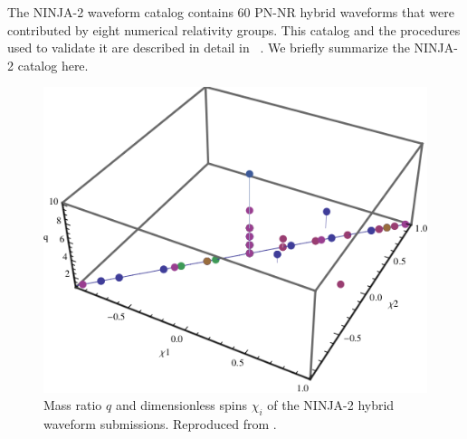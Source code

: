 The NINJA-2 waveform catalog contains 60 PN-NR hybrid waveforms that 
were contributed by eight numerical relativity groups.  This catalog and the 
procedures used to validate it are described in detail in
~\cite{Ajith:2012az}. We briefly summarize the NINJA-2 catalog 
here.

\begin{figure} 
\centerline{\includegraphics[width=0.95\linewidth]
{papers/mdc2013_submission/figure1.png}}
  \caption[Parameters of the NINJA-2 submissions]{
  \label{fig:ParameterSpace}
Mass ratio $q$ and dimensionless spins $\chi_i$ of the NINJA-2 hybrid
waveform submissions. Reproduced from \cite{Ajith:2012az}.
}
\end{figure}

